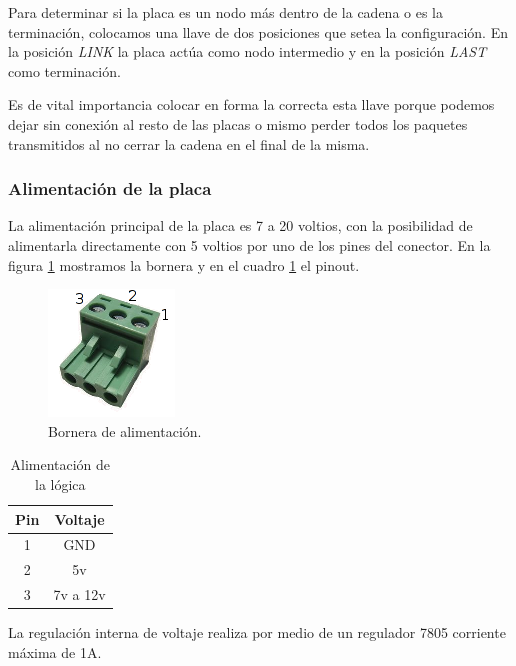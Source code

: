 Para determinar si la placa es un nodo m\'as dentro de la cadena o es la terminaci\'on, colocamos una llave de dos posiciones
que setea la configuraci\'on.
En la posici\'on \emph{LINK} la placa act\'ua como nodo intermedio y en la posici\'on \emph{LAST} como terminaci\'on.

Es de vital importancia colocar en forma la correcta esta llave porque podemos dejar sin conexi\'on al resto de las placas o mismo
perder todos los paquetes transmitidos al no cerrar la cadena en el final de la misma.

\subsubsection{Alimentaci\'on de la placa}
\label{h_placas_generica_alimentacion}

La alimentaci\'on principal de la placa es 7 a 20 voltios, con la posibilidad de alimentarla directamente con 5 voltios
por uno de los pines del conector.
En la figura \ref{hF_placa_gen_borneras} mostramos la bornera y en el cuadro \ref{hT_placa_gen_alimentacion} el pinout.

\begin{figure}[ht]
	\centering
	\includegraphics[scale=.3]{figuras/bornera3.png}
	\caption{Bornera de alimentaci\'on.}
	\label{hF_placa_gen_borneras}
\end{figure}

\begin{table}
	\begin{center}
		\begin{tabular}{|c|c|}
			\hline
			Pin & Voltaje \\
			\hline
			1 & GND \\
			\hline
			2 & 5v \\
			\hline
			3 & 7v a 12v \\
			\hline
		\end{tabular}
		\caption{Alimentaci\'on de la l\'ogica}
		\label{hT_placa_gen_alimentacion}
	\end{center}
\end{table}

La regulaci\'on interna de voltaje realiza por medio de un regulador 7805 corriente m\'axima de 1A.

